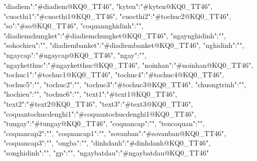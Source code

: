 {"diadiem":"#diadiem@KQ0_TT46",
   "kyten":"#kyten@KQ0_TT46",
   "cuocthi1":"#cuocthi1@KQ0_TT46",
     "cuocthi2":"#tochuc2@KQ0_TT46", 
     "so":"#so@KQ0_TT46",
     "coquannghidinh":"",
     "diadiemchungket":"#diadiemchungket@KQ0_TT46",
     "ngaynghidinh":"",
     "sohochieu":"",
     "diadiembanket":"#diadiembanket@KQ0_TT46",
     "nghidinh":"",
     "ngaycap":"#ngaycap@KQ0_TT46",
     "ngay":"",
     "ngayketthuc":"#ngayketthuc@KQ0_TT46",
     "noinhan":"#noinhan@KQ0_TT46",
     "tochuc1":"#tochuc1@KQ0_TT46",
     "tochuc4":"#tochuc4@KQ0_TT46",
     "tochuc5":"",
     "tochuc2":"",	
     "tochuc3":"#tochuc3@KQ0_TT46",
     "chuongtrinh":"",
     "hochieu":"",
     "tochuc6":"",
     "text1":"#text1@KQ0_TT46",
     "text2":"#text2@KQ0_TT46",
     "text3":"#text3@KQ0_TT46",
     "coquantochucdenghi1":"#coquantochucdenghi1@KQ0_TT46",
     "tungay":"#tungay@KQ0_TT46",
     "coquancap":"",
     "tencoquan":"",
     "coquancap2":"",
     "coquancap1":"",
     "sovanban":"#sovanban@KQ0_TT46",
     "coquancap3":"",
     "ongba":"",
     "dinhdanh":"#dinhdanh@KQ0_TT46",
     "songhidinh":"",
     "gp":"",
     "ngaybatdau":"#ngaybatdau@KQ0_TT46"}
